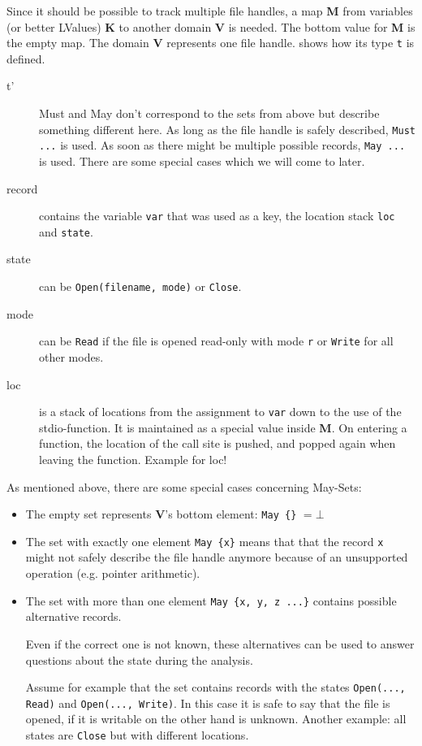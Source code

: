 Since it should be possible to track multiple file handles, a map \textbf{M} from variables (or better LValues) \textbf{K} to another domain \textbf{V} is needed. The bottom value for \textbf{M} is the empty map.
The domain \textbf{V} represents one file handle.  shows how its type \verb|t| is defined.
\begin{description}
\item[t'] Must and May don't correspond to the sets from above but describe something different here. As long as the file handle is safely described, \verb|Must ...| is used. As soon as there might be multiple possible records, \verb|May ...| is used. There are some special cases which we will come to later.

\item[record] contains the variable \verb|var| that was used as a key, the location stack \verb|loc| and \verb|state|.

\item[state] can be \verb|Open(filename, mode)| or \verb|Close|.

\item[mode] can be \verb|Read| if the file is opened read-only with mode \verb|r| or \verb|Write| for all other modes.

\item[loc] is a stack of locations from the assignment to \verb|var| down to the use of the stdio-function. It is maintained as a special value inside \textbf{M}. On entering a function, the location of the call site is pushed, and popped again when leaving the function.
Example for loc!
\end{description}
As mentioned above, there are some special cases concerning May-Sets:
\begin{itemize}
\item The empty set represents \textbf{V}'s bottom element: \verb|May {}| $ = \bot$
\item The set with exactly one element \verb|May {x}| means that that the record \verb|x| might not safely describe the file handle anymore because of an unsupported operation (e.g. pointer arithmetic).
\item The set with more than one element \verb|May {x, y, z ...}| contains possible alternative records. 

Even if the correct one is not known, these alternatives can be used to answer questions about the state during the analysis.

Assume for example that the set contains records with the states \verb|Open(..., Read)| and \verb|Open(..., Write)|. In this case it is safe to say that the file is opened, if it is writable on the other hand is unknown. Another example: all states are \verb|Close| but with different locations.
\end{itemize}



